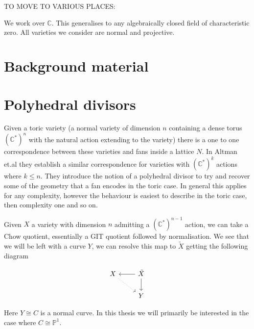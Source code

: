 \documentclass[11pt]{amsart}
\theoremstyle{definition}
\theoremstyle{definition}
\theoremstyle{definition}
\theoremstyle{definition}
\theoremstyle{definition}
\theoremstyle{definition}
\theoremstyle{definition}
\newcommand{\C}[1]{(\mathbb{C}^*)^#1}
\begin{document}
TO MOVE TO VARIOUS PLACES:

We work over $\mathbb{C}$. This generalises to any algebraically closed field of characteristic zero. All varieties we consider are normal and projective. 




\section{Background material}

\section{Polyhedral divisors}
Given a toric variety (a  normal variety of dimension $n$ containing a dense torus $\C{n}$ with the natural action extending to the variety) there is a one to one correspondence between these varieties and fans inside a lattice $N$. \cite{Cox} 
In Altman et.al \cite{Altmann} they establish a similar correspondence for varieties with $\C{k}$ actions where $k \leq n$. They introduce the notion of a polyhedral divisor to try and recover some of the geometry that a fan encodes in the toric case. In general this applies for any complexity, however the behaviour is easiest to describe in the toric case, then complexity one and so on.


Given $X$ a variety with dimension $n$ admitting a $(\mathbb{C}^*)^{n-1}$ action, we can take a Chow quotient, essentially a GIT quotient followed by normalisation. We see that we will be left with a curve $Y$, we can resolve this map to $\tilde{X}$ getting the following diagram

\[
\begin{tikzcd}
X \arrow[rd, dotted] & \tilde{X} \arrow[l] \arrow[d]\\
& Y
\end{tikzcd}
\]

Here $Y \cong C$ is a normal curve. In this thesis we will primarily be interested in the case where $C \cong \mathbb{P}^1$.
\end{document}
